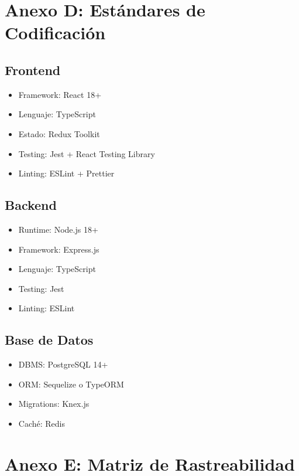 \documentclass[11pt,a4paper]{article}
\begin{document}
\begin{itemize}
\section{Anexo D: Estándares de Codificación}

\subsection{Frontend}

\begin{itemize}
    \item Framework: React 18+
    \item Lenguaje: TypeScript
    \item Estado: Redux Toolkit
    \item Testing: Jest + React Testing Library
    \item Linting: ESLint + Prettier
\end{itemize}

\subsection{Backend}

\begin{itemize}
    \item Runtime: Node.js 18+
    \item Framework: Express.js
    \item Lenguaje: TypeScript
    \item Testing: Jest
    \item Linting: ESLint
\end{itemize}

\subsection{Base de Datos}

\begin{itemize}
    \item DBMS: PostgreSQL 14+
    \item ORM: Sequelize o TypeORM
    \item Migrations: Knex.js
    \item Caché: Redis
\end{itemize}

\section{Anexo E: Matriz de Rastreabilidad}


\end{itemize}
\end{document}
